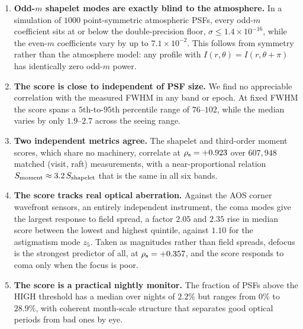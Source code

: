 \documentclass[]{spie}
\newcommand{\sshape}{S_{\rm shapelet}}
\newcommand{\smom}{S_{\rm moment}}
\begin{document}
\begin{enumerate}
  \item \textbf{Odd-$m$ shapelet modes are exactly blind to the atmosphere.} In a simulation
        of $1000$ point-symmetric atmospheric PSFs, every odd-$m$ coefficient sits at or
        below the double-precision floor, $\sigma \le 1.4 \times 10^{-16}$, while the
        even-$m$ coefficients vary by up to $7.1 \times 10^{-2}$. This follows from symmetry
        rather than the atmosphere model: any profile with
        $I(r,\theta) = I(r,\theta+\pi)$ has identically zero odd-$m$ power.
  \item \textbf{The score is close to independent of PSF size.} We find no appreciable
        correlation with the measured FWHM in any band or epoch. At fixed FWHM the score
        spans a $5$th-to-$95$th percentile range of $76$--$102$, while the median varies by
        only $1.9$--$2.7$ across the seeing range.
  \item \textbf{Two independent metrics agree.} The shapelet and third-order moment scores,
        which share no machinery, correlate at $\rho_{\rm s} = +0.923$ over $607{,}948$
        matched (visit, raft) measurements, with a near-proportional relation
        $\smom \approx 3.2\,\sshape$ that is the same in all six bands.
  \item \textbf{The score tracks real optical aberration.} Against the AOS corner wavefront
        sensors, an entirely independent instrument, the coma modes give the largest
        response to field spread, a factor $2.05$ and $2.35$ rise in median score between
        the lowest and highest quintile, against $1.10$ for the astigmatism mode $z_5$.
        Taken as magnitudes rather than field spreads, defocus is the strongest predictor
        of all, at $\rho_{\rm s} = +0.357$, and the score responds to coma only when the
        focus is poor.
  \item \textbf{The score is a practical nightly monitor.} The fraction of PSFs above the
        HIGH threshold has a median over nights of $2.2\%$ but ranges from $0\%$ to $28.9\%$,
        with coherent month-scale structure that separates good optical periods from bad
        ones by eye.
\end{enumerate}
\end{document}
